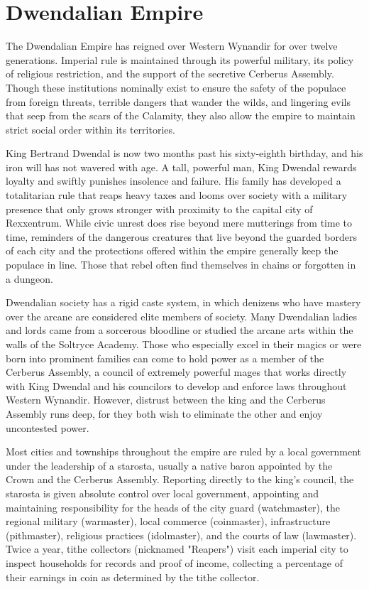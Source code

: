 \documentclass[10pt,a4paper,twoside,bg=print,twocolumn,openany,nodeprecatedcode]{dndbook}
\begin{document}
\section{Dwendalian Empire}
The Dwendalian Empire has reigned over Western Wynandir for over twelve generations. Imperial rule is maintained through its powerful military, its policy of religious restriction, and the support of the secretive Cerberus Assembly. Though these institutions nominally exist to ensure the safety of the populace from foreign threats, terrible dangers that wander the wilds, and lingering evils that seep from the scars of the Calamity, they also allow the empire to maintain strict social order within its territories.

King Bertrand Dwendal is now two months past his sixty-eighth birthday, and his iron will has not wavered with age. A tall, powerful man, King Dwendal rewards loyalty and swiftly punishes insolence and failure. His family has developed a totalitarian rule that reaps heavy taxes and looms over society with a military presence that only grows stronger with proximity to the capital city of Rexxentrum. While civic unrest does rise beyond mere mutterings from time to time, reminders of the dangerous creatures that live beyond the guarded borders of each city and the protections offered within the empire generally keep the populace in line. Those that rebel often find themselves in chains or forgotten in a dungeon.

Dwendalian society has a rigid caste system, in which denizens who have mastery over the arcane are considered elite members of society. Many Dwendalian ladies and lords came from a sorcerous bloodline or studied the arcane arts within the walls of the Soltryce Academy. Those who especially excel in their magics or were born into prominent families can come to hold power as a member of the Cerberus Assembly, a council of extremely powerful mages that works directly with King Dwendal and his councilors to develop and enforce laws throughout Western Wynandir. However, distrust between the king and the Cerberus Assembly runs deep, for they both wish to eliminate the other and enjoy uncontested power.

Most cities and townships throughout the empire are ruled by a local government under the leadership of a starosta, usually a native baron appointed by the Crown and the Cerberus Assembly. Reporting directly to the king's council, the starosta is given absolute control over local government, appointing and maintaining responsibility for the heads of the city guard (watchmaster), the regional military (warmaster), local commerce (coinmaster), infrastructure (pithmaster), religious practices (idolmaster), and the courts of law (lawmaster). Twice a year, tithe collectors (nicknamed "Reapers") visit each imperial city to inspect households for records and proof of income, collecting a percentage of their earnings in coin as determined by the tithe collector.
\end{document}
